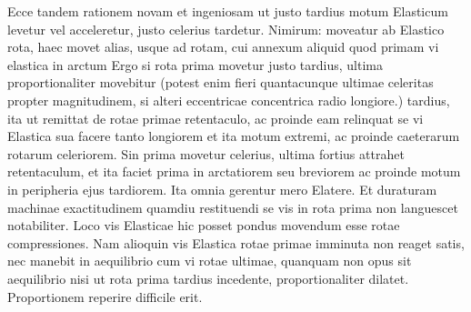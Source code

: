                    \pstart
Ecce tandem  rationem novam  et ingeniosam  ut justo tardius motum Elasticum\protect{} levetur  vel acceleretur, justo celerius  tardetur. Nimirum: moveatur ab Elastico\protect{} rota, haec  movet alias, usque ad rotam,  cui annexum aliquid quod  primam vi elastica\protect{} in arctum   Ergo si rota  prima movetur  justo tardius, ultima  proportionaliter movebitur (potest enim fieri quantacunque ultimae celeritas\protect{}  propter magnitudinem, si alteri eccentricae concentrica radio longiore.)  tardius, ita ut remittat de rotae  primae retentaculo, ac proinde  eam relinquat se vi Elastica\protect{}  sua facere tanto longiorem  et ita motum extremi,  ac proinde caeterarum rotarum  celeriorem. Sin prima  movetur celerius, ultima fortius attrahet retentaculum,  et ita faciet prima in arctatiorem seu breviorem  ac proinde motum in  peripheria ejus tardiorem.  Ita omnia gerentur mero Elatere\protect{}. Et duraturam  machinae exactitudinem  quamdiu restituendi se vis  in rota prima non languescet notabiliter. Loco vis\protect{}  Elasticae hic posset pondus\protect{}  movendum esse rotae compressiones\protect{}.  Nam alioquin vis Elastica\protect{} rotae  primae imminuta non reaget satis, nec manebit in aequilibrio\protect{} cum vi rotae  ultimae, quanquam non opus sit aequilibrio\protect{} nisi ut rota prima tardius incedente,  proportionaliter dilatet. Proportionem reperire difficile erit.\pend 
 


 


 


 


 

